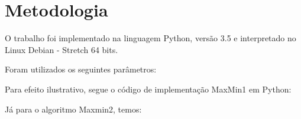 


\chapter{Metodologia}
\label{chap:metodologia}
O trabalho foi implementado na linguagem Python, versão 3.5 e interpretado no Linux Debian - Stretch 64 bits. 

Foram utilizados os seguintes parâmetros: 




Para efeito ilustrativo, segue o código de implementação MaxMin1 em Python:\\



\pagebreak

Já para o algoritmo Maxmin2, temos: \\





